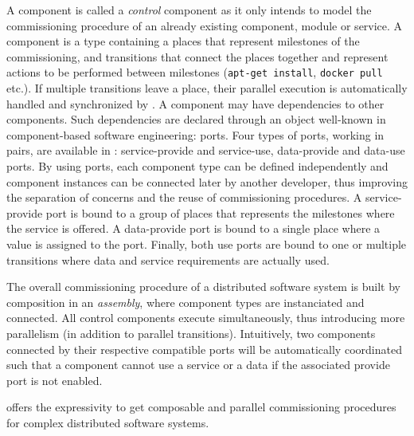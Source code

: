 A \mad component is called a \emph{control} component as it only
intends to model the commissioning procedure of an already existing
component, module or service. A \mad component is a type containing a
places that represent milestones of the commissioning, and transitions
that connect the places together and represent actions to be performed
between milestones (\eg \texttt{apt-get install}, \texttt{docker pull}
etc.). If multiple transitions leave a place, their parallel execution
is automatically handled and synchronized by \mad. A component may
have dependencies to other components. Such dependencies are declared
through an object well-known in component-based software engineering:
ports. Four types of ports, working in pairs, are available in \mad:
service-provide and service-use, data-provide and data-use ports. By
using ports, each component type can be defined independently and
component instances can be connected later by another developer, thus
improving the separation of concerns and the reuse of commissioning
procedures. A service-provide port is bound to a group of places that
represents the milestones where the service is offered. A data-provide
port is bound to a single place where a value is assigned to the
port. Finally, both use ports are bound to one or multiple transitions
where data and service requirements are actually used.

The overall commissioning procedure of a distributed software system
is built by composition in an \emph{assembly}, where component
types are instanciated and connected. All control components execute
simultaneously, thus introducing more parallelism (in addition to
parallel transitions). Intuitively, two components connected by their
respective compatible ports will be automatically coordinated such
that a component cannot use a service or a data if the associated
provide port is not enabled.

\mad offers the expressivity to get composable and parallel
commissioning procedures for complex distributed software systems.

